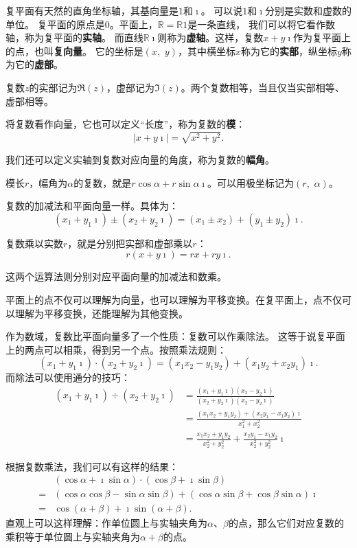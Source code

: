 \documentclass[12pt,UTF8]{ctexbook}
\theoremstyle{definition}
\theoremstyle{plain}
\begin{document}
复平面有天然的直角坐标轴，其基向量是$1$和$\imath$。
可以说$1$和$\imath$分别是实数和虚数的单位。
复平面的原点是$0$。平面上，$\mathbb{R} = \mathbb{R}1$是一条直线，
我们可以将它看作数轴，称为复平面的\textbf{实轴}。
而直线$\mathbb{R}\imath$则称为\textbf{虚轴}。这样，复数$x+y\imath$作为复平面上的点，也叫\textbf{复向量}。
它的坐标是$(x,\,\,y)$，其中横坐标$x$称为它的\textbf{实部}，纵坐标$y$称为它的\textbf{虚部}。

复数$z$的实部记为$\Re(z)$，虚部记为$\Im(z)$。两个复数相等，当且仅当实部相等、虚部相等。

将复数看作向量，它也可以定义“长度”，称为复数的\textbf{模}：
$$ |x + y\imath| = \sqrt{x^2 + y^2}.$$

我们还可以定义实轴到复数对应向量的角度，称为复数的\textbf{幅角}。

模长$r$，幅角为$\alpha$的复数，就是$r\cos{\alpha} + r\sin{\alpha}\imath$。可以用极坐标记为$(r,\,\,\alpha)$。

复数的加减法和平面向量一样。具体为：
$$ (x_1 + y_1\imath) \pm (x_2 + y_2\imath) = (x_1 \pm x_2) + (y_1 \pm y_2)\imath. $$

复数乘以实数$r$，就是分别把实部和虚部乘以$r$：
$$ r(x + y\imath) = rx + ry\imath. $$

这两个运算法则分别对应平面向量的加减法和数乘。

平面上的点不仅可以理解为向量，也可以理解为平移变换。在复平面上，点不仅可以理解为平移变换，还能理解为其他变换。

作为数域，复数比平面向量多了一个性质：复数可以作乘除法。
这等于说复平面上的两点可以相乘，得到另一个点。按照乘法规则：
$$ (x_1 + y_1\imath) \cdot (x_2 + y_2\imath) = (x_1x_2 - y_1y_2) + (x_1y_2 + x_2y_1)\imath. $$
而除法可以使用通分的技巧：
\begin{align*}
    (x_1 + y_1\imath) \div (x_2 + y_2\imath) &= \frac{(x_1 + y_1\imath)(x_2 - y_2\imath)}{(x_2 + y_2\imath)(x_2 - y_2\imath)} \\
    &= \frac{(x_1x_2 + y_1y_2) + (x_2y_1 - x_1y_2)\imath}{x_1^2 + x_2^2} \\
    &= \frac{x_1x_2 + y_1y_2}{x_2^2 + y_2^2} + \frac{x_2y_1 - x_1y_2}{x_2^2 + y_2^2}\imath
\end{align*}

根据复数乘法，我们可以有这样的结果：
\begin{align*}
     & (\cos{\alpha} + \imath\sin{\alpha}) \cdot (\cos{\beta} + \imath\sin{\beta}) \\
    =& (\cos{\alpha}\cos{\beta} - \sin{\alpha}\sin{\beta}) + (\cos{\alpha}\sin{\beta} + \cos{\beta}\sin{\alpha})\imath \\
    =& \cos{(\alpha + \beta)} + \imath\sin{(\alpha + \beta)}.
\end{align*}
直观上可以这样理解：作单位圆上与实轴夹角为$\alpha$、$\beta$的点，那么它们对应复数的乘积等于单位圆上与实轴夹角为$\alpha+\beta$的点。
\end{document}
